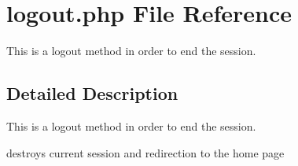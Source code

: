 \hypertarget{logout_8php}{}\section{logout.\+php File Reference}
\label{logout_8php}


This is a logout method in order to end the session.  




\subsection{Detailed Description}
This is a logout method in order to end the session. 

destroys current session and redirection to the home page 